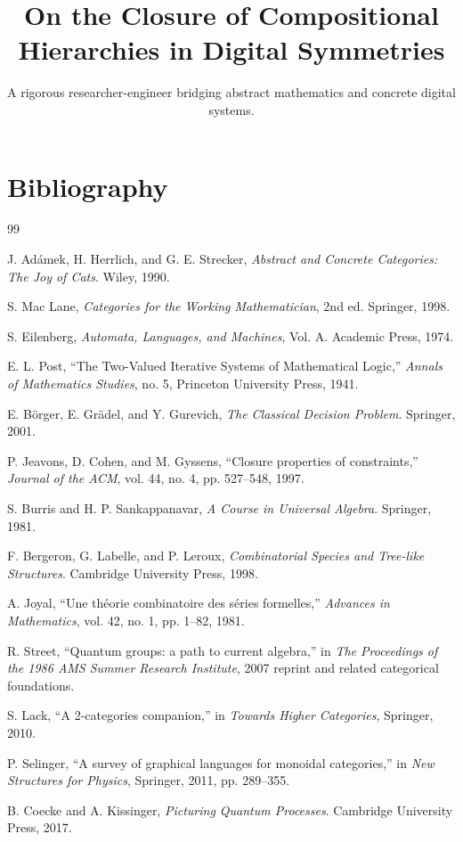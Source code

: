 \documentclass[11pt]{article}
\title{On the Closure of Compositional Hierarchies in Digital Symmetries}
\author{A rigorous researcher-engineer bridging abstract mathematics and concrete digital systems.}
\begin{document}
\section*{Bibliography}

\begin{thebibliography}{99}

 J. Ad\'{a}mek, H. Herrlich, and G. E. Strecker, \emph{Abstract and Concrete Categories: The Joy of Cats}. Wiley, 1990.

 S. Mac Lane, \emph{Categories for the Working Mathematician}, 2nd ed. Springer, 1998.

 S. Eilenberg, \emph{Automata, Languages, and Machines}, Vol. A. Academic Press, 1974. %

 E. L. Post, ``The Two-Valued Iterative Systems of Mathematical Logic,'' \emph{Annals of Mathematics Studies}, no. 5, Princeton University Press, 1941.

 E. B\"orger, E. Gr\"adel, and Y. Gurevich, \emph{The Classical Decision Problem}. Springer, 2001.

 P. Jeavons, D. Cohen, and M. Gyssens, ``Closure properties of constraints,'' \emph{Journal of the ACM}, vol. 44, no. 4, pp. 527--548, 1997.

 S. Burris and H. P. Sankappanavar, \emph{A Course in Universal Algebra}. Springer, 1981.

 F. Bergeron, G. Labelle, and P. Leroux, \emph{Combinatorial Species and Tree-like Structures}. Cambridge University Press, 1998.

 A. Joyal, ``Une th\'eorie combinatoire des s\'eries formelles,'' \emph{Advances in Mathematics}, vol. 42, no. 1, pp. 1--82, 1981.

 R. Street, ``Quantum groups: a path to current algebra,'' in \emph{The Proceedings of the 1986 AMS Summer Research Institute}, 2007 reprint and related categorical foundations.

 S. Lack, ``A 2-categories companion,'' in \emph{Towards Higher Categories}, Springer, 2010.

 P. Selinger, ``A survey of graphical languages for monoidal categories,'' in \emph{New Structures for Physics}, Springer, 2011, pp. 289--355.

 B. Coecke and A. Kissinger, \emph{Picturing Quantum Processes}. Cambridge University Press, 2017.


\end{thebibliography}
\end{document}
